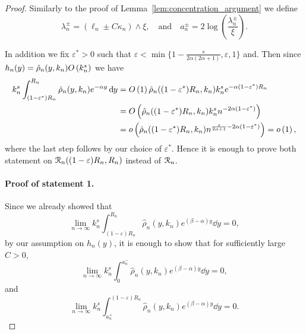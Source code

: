 \begin{proof}
Similarly to the proof of Lemma~\ref{lem:concentration_argument} we define 
\[
	\lambda_n^\pm = (\ell_n \pm C \kappa_n) \wedge \xi, \quad \text{and} \quad a_n^\pm = 2 \log\left(\frac{\lambda_n^\pm}{\xi}\right).
\] 

In addition we fix $\varepsilon^\ast > 0$ such that $\varepsilon < \min\{1- \frac{s}{2\alpha(2\alpha + 1)},\varepsilon, 1\}$ and. Then since $h_n(y) = \hat{\rho}_n(y,k_n) O\left(k_n^s\right)$ we have
\begin{align*}
	k_n^s \int_{(1-\varepsilon^\ast)R_n}^{R_n} \hat{\rho}_n(y,k_n) e^{-\alpha y} \operatorname{\mathrm{d}\hspace{-2pt}} y
	&= O\left(1\right) \hat{\rho}_n((1-\varepsilon^\ast)R_n,k_n) k_n^s e^{-\alpha(1-\varepsilon^\ast)R_n} \\
	&= O\left(\hat{\rho}_n((1-\varepsilon^\ast)R_n,k_n) k_n^s n^{-2\alpha(1 - \varepsilon^\ast)}\right) \\
	&= o\left( \hat{\rho}_n((1-\varepsilon^\ast)R_n,k_n) n^{\frac{s}{2\alpha + 1} - 2\alpha(1-\varepsilon^\ast)}\right) = o\left(1\right),
\end{align*}
where the last step follows by our choice of $\varepsilon^\ast$. Hence it is enough to prove both statement on ${\mathcal R}_n((1-\varepsilon)R_n, R_n)$ instead of ${\mathcal R}_n$.

\paragraph{Proof of statement 1.}
Since we already showed that
\[
	\lim_{n \to \infty} k_n^s \int_{(1-\varepsilon)R_n}^{R_n} \hat{\rho}_n(y,k_n) e^{(\beta-\alpha) y} \dd y = 0,
\]
by our assumption on $h_n(y)$, it is enough to show that for sufficiently large $C > 0$,
\begin{equation}\label{eq:concentration_argument_an_-}
	\lim_{n \to \infty} k_n^s \int_0^{a_n^-} \hat{\rho}_n(y,k_n) e^{(\beta-\alpha) y} \dd y = 0,
\end{equation}
and
\begin{equation}\label{eq:concentration_argument_an_+}
	\lim_{n \to \infty} k_n^s \int_{a_n^+}^{(1-\varepsilon)R_n} \hat{\rho}_n(y,k_n) e^{(\beta-\alpha) y} \dd y = 0.
\end{equation}


\end{proof}
